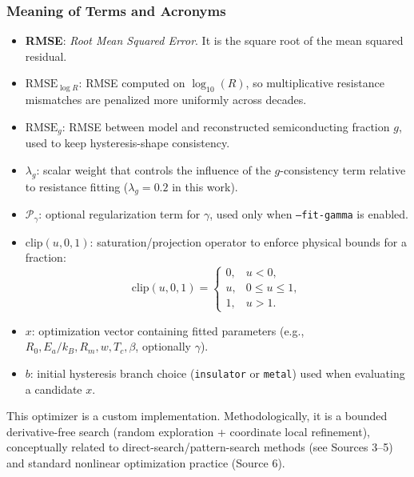 \documentclass[11pt]{article}
\begin{document}
\subsubsection*{Meaning of Terms and Acronyms}
\begin{itemize}
    \item \textbf{RMSE}: \emph{Root Mean Squared Error}. It is the square root of the mean squared residual.
    \item \(\mathrm{RMSE}_{\log R}\): RMSE computed on \(\log_{10}(R)\), so multiplicative resistance mismatches are penalized more uniformly across decades.
    \item \(\mathrm{RMSE}_{g}\): RMSE between model and reconstructed semiconducting fraction \(g\), used to keep hysteresis-shape consistency.
    \item \(\lambda_g\): scalar weight that controls the influence of the \(g\)-consistency term relative to resistance fitting (\(\lambda_g=0.2\) in this work).
    \item \(\mathcal{P}_\gamma\): optional regularization term for \(\gamma\), used only when \texttt{--fit-gamma} is enabled.
    \item \(\mathrm{clip}(u,0,1)\): saturation/projection operator to enforce physical bounds for a fraction:
    \[
    \mathrm{clip}(u,0,1)=
    \begin{cases}
    0,& u<0,\\
    u,& 0\le u\le 1,\\
    1,& u>1.
    \end{cases}
    \]
    \item \(x\): optimization vector containing fitted parameters (e.g., \(R_0,E_a/k_B,R_m,w,T_c,\beta\), optionally \(\gamma\)).
    \item \(b\): initial hysteresis branch choice (\texttt{insulator} or \texttt{metal}) used when evaluating a candidate \(x\).
\end{itemize}

This optimizer is a custom implementation. Methodologically, it is a bounded derivative-free search (random exploration + coordinate local refinement), conceptually related to direct-search/pattern-search methods (see Sources 3--5) and standard nonlinear optimization practice (Source 6).
\end{document}
